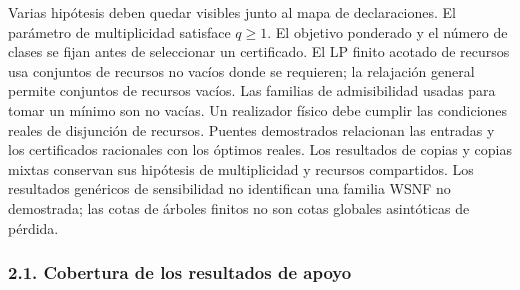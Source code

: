 \documentclass[spanish,11pt,a4paper]{article}
\begin{document}
Varias hipótesis deben quedar visibles junto al mapa de declaraciones.
El parámetro de multiplicidad satisface \(q\ge1\). El objetivo ponderado
y el número de clases se fijan antes de seleccionar un certificado. El
LP finito acotado de recursos usa conjuntos de recursos no vacíos donde
se requieren; la relajación general permite conjuntos de recursos
vacíos. Las familias de admisibilidad usadas para tomar un mínimo son no
vacías. Un realizador físico debe cumplir las condiciones reales de
disjunción de recursos. Puentes demostrados relacionan las entradas y
los certificados racionales con los óptimos reales. Los resultados de
copias y copias mixtas conservan sus hipótesis de multiplicidad y
recursos compartidos. Los resultados genéricos de sensibilidad no
identifican una familia WSNF no demostrada; las cotas de árboles finitos
no son cotas globales asintóticas de pérdida.

\subsubsection{2.1. Cobertura de los resultados de
apoyo}\label{cobertura-de-los-resultados-de-apoyo}
\end{document}
